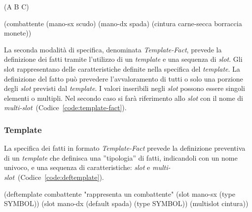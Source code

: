 \begin{program}
\begin{verbatimtab}

(A B C)
\end{verbatimtab}
\caption{Fatto definito utilizzando la notazione \emph{Ordered-Fact}}\label{code:ordered-fact}
\end{program}


\begin{program}
\begin{verbatimtab}

(combattente
	(mano-sx scudo)
	(mano-dx spada)
	(cintura carne-secca borraccia monete))
\end{verbatimtab}
\caption[Fatto definito utilizzando la notazione \emph{Template-Fact}]{Fatto definito utilizzando la notazione \emph{Template-Fact}. Il nome del template a cui il fatto fa riferimento è \emph{combattente}. La specifica del \emph{template} prevede l'esistenza degli slot ''mano-sx'', ''mano-dx'' e ''cintura''}\label{code:template-fact}
\end{program}

La seconda modalità di specifica, denominata \emph{Template-Fact}, prevede la definizione dei fatti tramite l'utilizzo di un \emph{template} e una sequenza di \emph{slot}. Gli slot rappresentano delle caratteristiche definite nella specifica del \emph{template}.
La definizione del fatto può prevedere l'avvaloramento di tutti o solo una porzione degli \emph{slot} previsti dal \emph{template}.
I valori inseribili negli \emph{slot} possono essere singoli elementi o multipli. Nel secondo caso si farà riferimento allo \emph{slot} con il nome di \emph{multi-slot}~(Codice~\ref{code:template-fact}).

\subsubsection{Template}\label{par:linguaggio-template}
La specifica dei fatti in formato \emph{Template-Fact} prevede la definizione preventiva di un \emph{template} che definisca una ''tipologia'' di fatti, indicandoli con un nome univoco, e una sequenza di caratteristiche: \emph{slot} e \emph{multi-slot}~(Codice~\ref{code:deftemplate}).

\begin{program}
\begin{verbatimtab}

(deftemplate combattente "rappresenta un combattente"
	(slot mano-sx 
		(type SYMBOL))
	(slot mano-dx
		(default spada)
		(type SYMBOL))
	(multislot cintura))
\end{verbatimtab}
\caption{Specifica di \emph{Template} tramite \emph{deftemplate}. L'esempio mostra una possibile definizione di template valida per l'esempio in Codice~\ref{code:template-fact}}\label{code:deftemplate}
\end{program}

